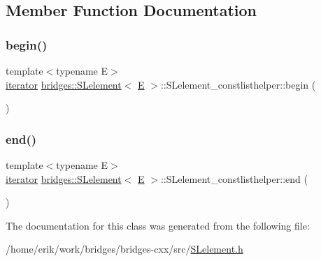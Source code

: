 \subsection{Member Function Documentation}
\mbox{\label{classbridges_1_1_s_lelement_1_1_s_lelement__constlisthelper_a8e249ed544f62a325b0e5b047519b70e}} 
\subsubsection{\texorpdfstring{begin()}{begin()}}
{\footnotesize\ttfamily template$<$typename E$>$ \\
\hyperlink{classbridges_1_1_s_lelement_1_1_s_lelement__constlisthelper_1_1iterator}{iterator} \hyperlink{classbridges_1_1_s_lelement}{bridges\+::\+S\+Lelement}$<$ \hyperlink{namespacebridges_acfb0a4f7877d8f63de3e6862004c50eda3a3ea00cfc35332cedf6e5e9a32e94da}{E} $>$\+::S\+Lelement\+\_\+constlisthelper\+::begin (\begin{DoxyParamCaption}{ }\end{DoxyParamCaption})\hspace{0.3cm}{\ttfamily [inline]}}

\mbox{\label{classbridges_1_1_s_lelement_1_1_s_lelement__constlisthelper_a55dafccf3d35b8746b2de761c2309cef}} 
\subsubsection{\texorpdfstring{end()}{end()}}
{\footnotesize\ttfamily template$<$typename E$>$ \\
\hyperlink{classbridges_1_1_s_lelement_1_1_s_lelement__constlisthelper_1_1iterator}{iterator} \hyperlink{classbridges_1_1_s_lelement}{bridges\+::\+S\+Lelement}$<$ \hyperlink{namespacebridges_acfb0a4f7877d8f63de3e6862004c50eda3a3ea00cfc35332cedf6e5e9a32e94da}{E} $>$\+::S\+Lelement\+\_\+constlisthelper\+::end (\begin{DoxyParamCaption}{ }\end{DoxyParamCaption})\hspace{0.3cm}{\ttfamily [inline]}}



The documentation for this class was generated from the following file\+:\begin{DoxyCompactItemize}
\item 
/home/erik/work/bridges/bridges-\/cxx/src/\hyperlink{_s_lelement_8h}{S\+Lelement.\+h}\end{DoxyCompactItemize}
